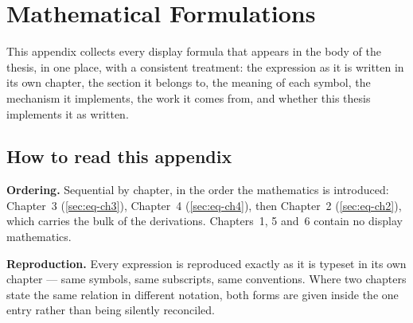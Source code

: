 %
%
%     
%
%
%

\chapter{Mathematical Formulations}
\label{ch:formulas}

This appendix collects every display formula that appears in the body of the
thesis, in one place, with a consistent treatment: the expression as it is
written in its own chapter, the section it belongs to, the meaning of each
symbol, the mechanism it implements, the work it comes from, and whether this
thesis implements it as written.

\section*{How to read this appendix}

\textbf{Ordering.} Sequential by chapter, in the order the mathematics is
introduced: Chapter~3 (\autoref{sec:eq-ch3}), Chapter~4
(\autoref{sec:eq-ch4}), then Chapter~2 (\autoref{sec:eq-ch2}), which carries
the bulk of the derivations. Chapters~1, 5 and~6 contain no display
mathematics.

\textbf{Reproduction.} Every expression is reproduced exactly as it is
typeset in its own chapter --- same symbols, same subscripts, same
conventions. Where two chapters state the same relation in different notation,
both forms are given inside the one entry rather than being silently
reconciled.

